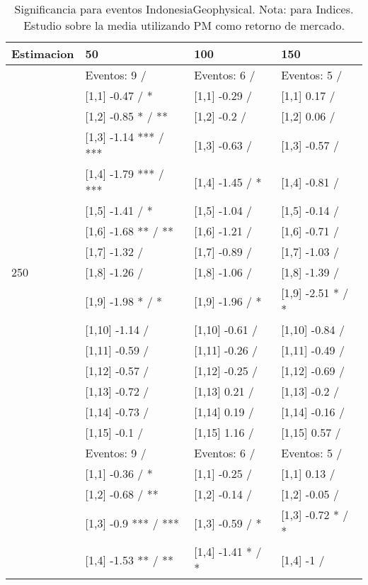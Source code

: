\begin{table}

\caption{Significancia para eventos IndonesiaGeophysical. Nota: para Indices. Estudio sobre la media utilizando PM como retorno de mercado.}
\centering
\begin{tabular}[t]{llll}
\toprule
Estimacion & 50 & 100 & 150\\
\midrule
 & Eventos:  9 / & Eventos:  6 / & Eventos:  5 /\\
 & {}[1,1] -0.47  / * & {}[1,1] -0.29  / & {}[1,1] 0.17  /\\
 & {}[1,2] -0.85 * / ** & {}[1,2] -0.2  / & {}[1,2] 0.06  /\\
 & {}[1,3] -1.14 *** / *** & {}[1,3] -0.63  / & {}[1,3] -0.57  /\\
 & {}[1,4] -1.79 *** / *** & {}[1,4] -1.45  / * & {}[1,4] -0.81  /\\
\addlinespace
 & {}[1,5] -1.41  / * & {}[1,5] -1.04  / & {}[1,5] -0.14  /\\
 & {}[1,6] -1.68 ** / ** & {}[1,6] -1.21  / & {}[1,6] -0.71  /\\
 & {}[1,7] -1.32  / & {}[1,7] -0.89  / & {}[1,7] -1.03  /\\
250 & {}[1,8] -1.26  / & {}[1,8] -1.06  / & {}[1,8] -1.39  /\\
 & {}[1,9] -1.98 * / * & {}[1,9] -1.96  / * & {}[1,9] -2.51 * / *\\
\addlinespace
 & {}[1,10] -1.14  / & {}[1,10] -0.61  / & {}[1,10] -0.84  /\\
 & {}[1,11] -0.59  / & {}[1,11] -0.26  / & {}[1,11] -0.49  /\\
 & {}[1,12] -0.57  / & {}[1,12] -0.25  / & {}[1,12] -0.69  /\\
 & {}[1,13] -0.72  / & {}[1,13] 0.21  / & {}[1,13] -0.2  /\\
 & {}[1,14] -0.73  / & {}[1,14] 0.19  / & {}[1,14] -0.16  /\\
\addlinespace
 & {}[1,15] -0.1  / & {}[1,15] 1.16  / & {}[1,15] 0.57  /\\
 & Eventos:  9 / & Eventos:  6 / & Eventos:  5 /\\
 & {}[1,1] -0.36  / * & {}[1,1] -0.25  / & {}[1,1] 0.13  /\\
 & {}[1,2] -0.68  / ** & {}[1,2] -0.14  / & {}[1,2] -0.05  /\\
 & {}[1,3] -0.9 *** / *** & {}[1,3] -0.59  / * & {}[1,3] -0.72 * / *\\
\addlinespace
 & {}[1,4] -1.53 ** / ** & {}[1,4] -1.41 * / * & {}[1,4] -1  /\\

\end{tabular}
\end{table}
